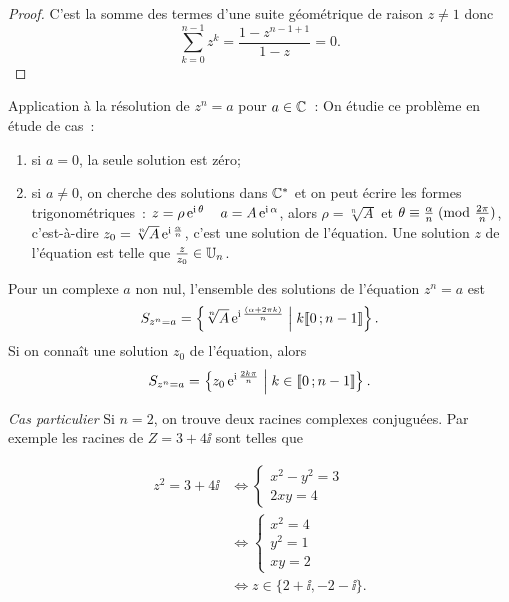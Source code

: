 \begin{proof}
  C'est la somme des termes d'une suite géométrique de raison \(z \neq 1\)
  donc
  \begin{equation*}
    \sum_{k = 0}^{n-1} z^k = \frac{1-z^{n-1 + 1}}{1-z} = 0.
  \end{equation*}
\end{proof}

Application à la résolution de \(z^n = a\) pour \(a \in{}\mathbb{C}\)~: On étudie ce
problème en étude de cas~:
\begin{enumerate}
  \item si \(a = 0\), la seule solution est zéro;
  \item si \(a \neq 0\), on cherche des solutions dans \(\mathbb{C}^*\) et on peut
    écrire les formes trigonométriques~: \(z = \rho \operatorname{e}^{\operatorname{i} \theta} \quad a =
    A \operatorname{e}^{\operatorname{i} \alpha}\), alors \(\rho = \sqrt[n]{A}\) et
    \(\theta \equiv \frac{\alpha}{n}\!\pmod {\frac{2\pi}{n}}\), c'est-à-dire
    \(z_0 = \sqrt[n]{A}  \operatorname{e}^{\operatorname{i} \frac{\alpha}{n}}\), c'est une solution de
    l'équation. Une solution \(z\) de l'équation est telle que
    \(\frac{z}{z_0} \in{}\mathbb{U}_n\).
\end{enumerate}

\begin{prop}
  Pour un complexe \(a\) non nul, l'ensemble des solutions de l'équation \(z^n
  = a\) est
  \begin{equation}
    S_{z^n = a} = \left\{\sqrt[n]{A} \operatorname{e}^{\operatorname{i} \frac{(\alpha + 2\pi k)}{n}}\mathrel{}\middle|\mathrel{}k
    \mathopen{\llbracket}0\mathclose{}\mathpunct{};n-1\mathclose{\rrbracket}\right\}.
  \end{equation}
  Si on connaît une solution \(z_0\) de l'équation, alors
  \begin{equation}
    S_{z^n = a} = \left\{z_0 \operatorname{e}^{\operatorname{i} \frac{2 k \pi}{n}}\mathrel{}\middle|\mathrel{}k \in{}
    \mathopen{\llbracket}0\mathclose{}\mathpunct{};n-1\mathclose{\rrbracket}\right\}.
  \end{equation}
\end{prop}

\emph{Cas particulier}
Si \(n = 2\), on trouve deux racines complexes conjuguées. Par exemple les
racines de \(Z = 3 + 4\ii\) sont telles que

\begin{align*}
  z^2 = 3 + 4\ii{}& \iff  \begin{cases} x^2-y^2 = 3 \\ 2xy = 4 \end{cases} \\
    & \iff \begin{cases} x^2 = 4 \\ y^2 = 1 \\ xy = 2 \end{cases} \\
      & \iff z \in{}\{2 + \ii, -2-\ii\}.
\end{align*}


